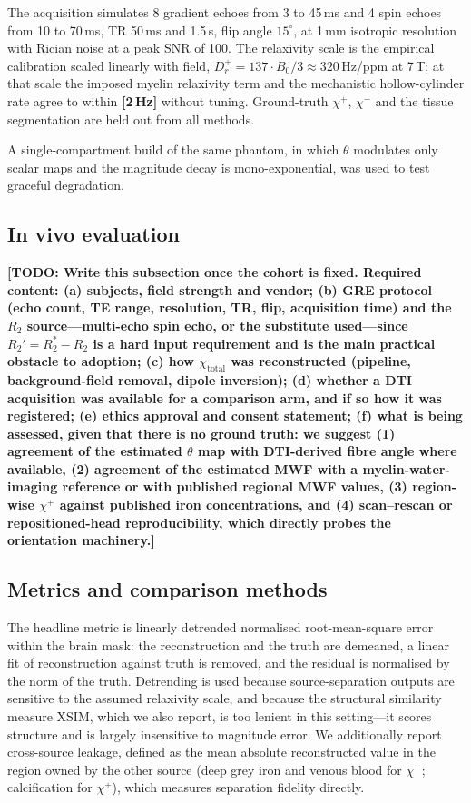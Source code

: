 \documentclass[AMA,STIX2COL,Linenumberson]{MRM}
\newcommand{\TODO}[1]{{\color{red}\textbf{[TODO: #1]}}}
\newcommand{\NUM}[1]{{\color{red}\textbf{[#1]}}}
\newcommand{\TODO}[1]{}
\newcommand{\NUM}[1]{#1}
\begin{document}
The acquisition simulates 8 gradient echoes from 3 to 45\,ms and 4 spin echoes from 10 to 70\,ms, TR 50\,ms and 1.5\,s, flip angle $15^\circ$, at 1\,mm isotropic resolution with Rician noise at a peak SNR of 100. The relaxivity scale is the empirical calibration scaled linearly with field, $D_r^{+}=137\cdot B_0/3 \approx 320$\,Hz/ppm at 7\,T; at that scale the imposed myelin relaxivity term and the mechanistic hollow-cylinder rate agree to within \NUM{2\,Hz} without tuning. Ground-truth $\chi^{+}$, $\chi^{-}$ and the tissue segmentation are held out from all methods.

A single-compartment build of the same phantom, in which $\theta$ modulates only scalar maps and the magnitude decay is mono-exponential, was used to test graceful degradation.

\subsection{In vivo evaluation}

\TODO{Write this subsection once the cohort is fixed. Required content:
(a) subjects, field strength and vendor;
(b) GRE protocol (echo count, TE range, resolution, TR, flip, acquisition time) and the $R_2$ source---multi-echo spin echo, or the substitute used---since $R_2'=R_2^{*}-R_2$ is a hard input requirement and is the main practical obstacle to adoption;
(c) how $\chi_{\mathrm{total}}$ was reconstructed (pipeline, background-field removal, dipole inversion);
(d) whether a DTI acquisition was available for a comparison arm, and if so how it was registered;
(e) ethics approval and consent statement;
(f) what is being assessed, given that there is no ground truth: we suggest (1) agreement of the estimated $\theta$ map with DTI-derived fibre angle where available, (2) agreement of the estimated MWF with a myelin-water-imaging reference or with published regional MWF values, (3) region-wise $\chi^{+}$ against published iron concentrations, and (4) scan--rescan or repositioned-head reproducibility, which directly probes the orientation machinery.}

\subsection{Metrics and comparison methods}

The headline metric is linearly detrended normalised root-mean-square error within the brain mask: the reconstruction and the truth are demeaned, a linear fit of reconstruction against truth is removed, and the residual is normalised by the norm of the truth. Detrending is used because source-separation outputs are sensitive to the assumed relaxivity scale, and because the structural similarity measure XSIM, which we also report, is too lenient in this setting---it scores structure and is largely insensitive to magnitude error. We additionally report cross-source leakage, defined as the mean absolute reconstructed value in the region owned by the other source (deep grey iron and venous blood for $\chi^{-}$; calcification for $\chi^{+}$), which measures separation fidelity directly.
\end{document}
